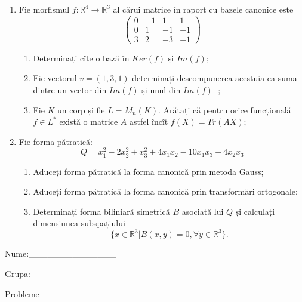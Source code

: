 \documentclass{article}
\begin{document}
\begin{enumerate}
 \item Fie morfismul $f:\mathbb{R}^4 \to \mathbb{R}^3$ al cărui matrice în raport cu bazele canonice este
$$\begin{pmatrix}
0&-1&1&1\\
0&1&-1&-1\\
3&2&-3&-1
\end{pmatrix}$$

\begin{enumerate}
\item Determinați cîte o bază în $Ker(f)$ și $Im(f)$;
\item Fie vectorul $v=(1,3,1)$ determinați descompunerea acestuia ca suma dintre un vector din $Im(f)$ și unul din $Im(f)^\perp$;
\item Fie $K$ un corp și fie $L=M_n(K)$. Arătați că pentru orice funcțională $f \in L^*$ există o matrice $A$ astfel încît $f(X)=Tr(AX)$;
\end{enumerate}
\item Fie forma pătratică:
$$Q= x_1^2-2x_2^2+x_3^2+4x_1x_2-10x_1x_3+4x_2x_3$$

\begin{enumerate}
\item Aduceți forma pătratică la forma canonică prin metoda Gauss;
\item Aduceți forma pătratică la forma canonică prin transformări ortogonale;
\item Determinați forma biliniară simetrică $B$ asociată lui $Q$ și calculați dimensiunea subspațiului
$$\{x \in \mathbb{R}^3 | B(x,y)=0,\forall y \in \mathbb{R}^3\}.$$

\end{enumerate}
\end{enumerate}
\newpage
\begin{flushright}
Nume:\_\_\_\_\_\_\_\_\_\_\_\_\_\_
 
 
Grupa:\_\_\_\_\_\_\_\_\_\_\_\_\_\_
\end{flushright}
\begin{center}
\vspace{2cm}
{\Large Probleme}
\vspace{2cm}
\end{center}
\end{document}
